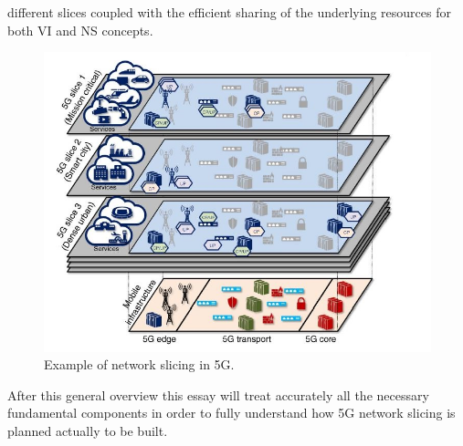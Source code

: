 \documentclass[a4paper,12pt]{report} %
\begin{document}
different slices coupled with the efficient sharing of the underlying resources
for both VI and NS concepts.\\
\begin{figure}[H]
\centering
\includegraphics[scale=0.65]{pics/1.JPG}
\caption{Example of network slicing in 5G. \cite{al20185g}}
\label{layers}
\end{figure}
After this general overview this essay will treat accurately all the necessary fundamental components in order to fully understand how 5G network slicing is planned actually to be built.


\newpage
\end{document}

